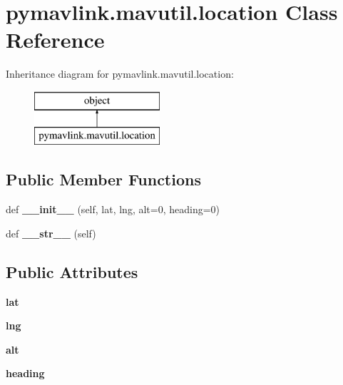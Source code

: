 \hypertarget{classpymavlink_1_1mavutil_1_1location}{}\section{pymavlink.\+mavutil.\+location Class Reference}
\label{classpymavlink_1_1mavutil_1_1location}
Inheritance diagram for pymavlink.\+mavutil.\+location\+:\begin{figure}[H]
\begin{center}
\leavevmode
\includegraphics[height=2.000000cm]{classpymavlink_1_1mavutil_1_1location}
\end{center}
\end{figure}
\subsection*{Public Member Functions}
\begin{DoxyCompactItemize}
\item 
\mbox{\label{classpymavlink_1_1mavutil_1_1location_a05f23187a42be511f0c0c50c2b15de94}} 
def {\bfseries \+\_\+\+\_\+init\+\_\+\+\_\+} (self, lat, lng, alt=0, heading=0)
\item 
\mbox{\label{classpymavlink_1_1mavutil_1_1location_a1ac1d1a6d3fc7c28970bea2912213efb}} 
def {\bfseries \+\_\+\+\_\+str\+\_\+\+\_\+} (self)
\end{DoxyCompactItemize}
\subsection*{Public Attributes}
\begin{DoxyCompactItemize}
\item 
\mbox{\label{classpymavlink_1_1mavutil_1_1location_a0e7492d02b5461d3e341f14c63987159}} 
{\bfseries lat}
\item 
\mbox{\label{classpymavlink_1_1mavutil_1_1location_a6226c212e18f9de2b4f8291952dd58df}} 
{\bfseries lng}
\item 
\mbox{\label{classpymavlink_1_1mavutil_1_1location_abdc87548778ac2d52235734f06f5b1d8}} 
{\bfseries alt}
\item 
\mbox{\label{classpymavlink_1_1mavutil_1_1location_a31941d0a3788aaf07b3f72b73350ee14}} 
{\bfseries heading}
\end{DoxyCompactItemize}


